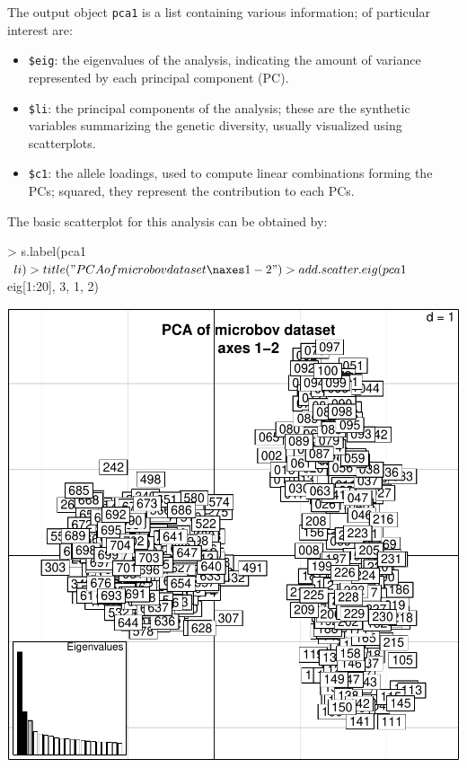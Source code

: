 \documentclass{article}
\begin{document}
The output object \texttt{pca1} is a list containing various information; of particular interest are:
\begin{itemize}
\item \texttt{\$eig}: the eigenvalues of the analysis, indicating the amount of variance represented
  by each principal component (PC).
\item \texttt{\$li}: the principal components of the analysis; these are the synthetic variables
  summarizing the genetic diversity, usually visualized using scatterplots.
\item \texttt{\$c1}: the allele loadings, used to compute linear combinations forming the PCs;
  squared, they represent the contribution to each PCs.
\end{itemize}

The basic scatterplot for this analysis can be obtained by:
\begin{Schunk}
\begin{Sinput}
> s.label(pca1$li)
> title("PCA of microbov dataset\naxes 1-2")
> add.scatter.eig(pca1$eig[1:20], 3, 1, 2)
\end{Sinput}
\end{Schunk}
\includegraphics{figs/base-070}
\end{document}
